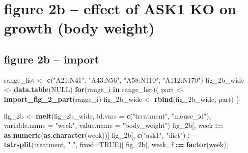 \documentclass[]{book}
\newenvironment{Shaded}{\begin{snugshade}}{\end{snugshade}}
\newcommand{\CommentTok}[1]{\textcolor[rgb]{0.56,0.35,0.01}{\textit{#1}}}
\newcommand{\ControlFlowTok}[1]{\textcolor[rgb]{0.13,0.29,0.53}{\textbf{#1}}}
\newcommand{\DataTypeTok}[1]{\textcolor[rgb]{0.13,0.29,0.53}{#1}}
\newcommand{\ErrorTok}[1]{\textcolor[rgb]{0.64,0.00,0.00}{\textbf{#1}}}
\newcommand{\KeywordTok}[1]{\textcolor[rgb]{0.13,0.29,0.53}{\textbf{#1}}}
\newcommand{\NormalTok}[1]{#1}
\newcommand{\OperatorTok}[1]{\textcolor[rgb]{0.81,0.36,0.00}{\textbf{#1}}}
\newcommand{\OtherTok}[1]{\textcolor[rgb]{0.56,0.35,0.01}{#1}}
\newcommand{\StringTok}[1]{\textcolor[rgb]{0.31,0.60,0.02}{#1}}
\begin{document}
\begin{Shaded}
\end{Shaded}

\hypertarget{figure-2b-effect-of-ask1-ko-on-growth-body-weight}{%
\section{figure 2b -- effect of ASK1 KO on growth (body weight)}\label{figure-2b-effect-of-ask1-ko-on-growth-body-weight}}

\hypertarget{figure-2b-import}{%
\subsection{figure 2b -- import}\label{figure-2b-import}}

\begin{Shaded}
\begin{Highlighting}[]
\NormalTok{range_list <-}\StringTok{ }\KeywordTok{c}\NormalTok{(}\StringTok{"A21:N41"}\NormalTok{, }\StringTok{"A43:N56"}\NormalTok{, }\StringTok{"A58:N110"}\NormalTok{, }\StringTok{"A112:N170"}\NormalTok{)}
\NormalTok{fig_2b_wide <-}\StringTok{ }\KeywordTok{data.table}\NormalTok{(}\OtherTok{NULL}\NormalTok{)}
\ControlFlowTok{for}\NormalTok{(range_i }\ControlFlowTok{in}\NormalTok{ range_list)\{}
\NormalTok{  part <-}\StringTok{ }\KeywordTok{import_fig_2_part}\NormalTok{(range_i)}
\NormalTok{  fig_2b_wide <-}\StringTok{ }\KeywordTok{rbind}\NormalTok{(fig_2b_wide,}
\NormalTok{                       part)}
\NormalTok{\}}

\NormalTok{fig_2b <-}\StringTok{ }\KeywordTok{melt}\NormalTok{(fig_2b_wide,}
               \DataTypeTok{id.vars =} \KeywordTok{c}\NormalTok{(}\StringTok{"treatment"}\NormalTok{, }\StringTok{"mouse_id"}\NormalTok{),}
               \DataTypeTok{variable.name =} \StringTok{"week"}\NormalTok{,}
               \DataTypeTok{value.name =} \StringTok{"body_weight"}\NormalTok{)}
\NormalTok{fig_2b[, week }\OperatorTok{:}\ErrorTok{=}\StringTok{ }\KeywordTok{as.numeric}\NormalTok{(}\KeywordTok{as.character}\NormalTok{(week))]}
\NormalTok{fig_2b[, }\KeywordTok{c}\NormalTok{(}\StringTok{"ask1"}\NormalTok{, }\StringTok{"diet"}\NormalTok{) }\OperatorTok{:}\ErrorTok{=}\StringTok{ }\KeywordTok{tstrsplit}\NormalTok{(treatment, }\StringTok{" "}\NormalTok{, }\DataTypeTok{fixed=}\OtherTok{TRUE}\NormalTok{)]}
\NormalTok{fig_2b[, week_f }\OperatorTok{:}\ErrorTok{=}\StringTok{ }\KeywordTok{factor}\NormalTok{(week)]}
\end{Highlighting}
\end{Shaded}
\end{document}
